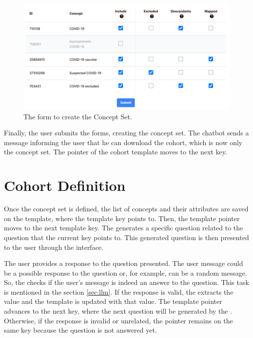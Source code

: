 \begin{figure}[H]
  \includegraphics[width=1\textwidth]{figs/chapter4/form.png}
  \centering
  \caption{The form to create the Concept Set.}
  \label{fig_forms}
\end{figure}

Finally, the user submits the forms, creating the concept set. The chatbot sends a message informing the user that he can download the cohort, which is now only the concept set. The pointer of the cohort template moves to the next key.



\section{Cohort Definition}




Once the concept set is defined, the list of concepts and their attributes are saved on the template, where the template key points to. Then, the template pointer moves to the next template key. The {\llm} generates a specific question related to the question that the current key points to. This generated question is then presented to the user through the interface.

The user provides a response to the question presented. The user message could be a possible response to the question or, for example, can be a random message. So, the {\llm} checks if the user's message is indeed an answer to the question. This task is mentioned in the section \ref{sec:llm}. If the response is valid, the {\llm} extracts the value and the template is updated with that value. The template pointer advances to the next key, where the next question will be generated by the {\llm}. Otherwise, if the response is invalid or unrelated, the pointer remains on the same key because the question is not answered yet.

